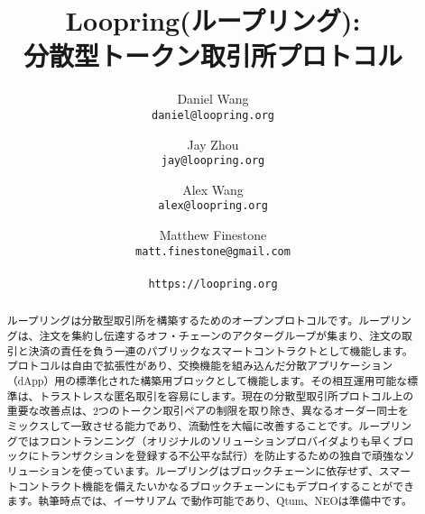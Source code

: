 \documentclass{article}
\title{\textbf{Loopring(ループリング):}\\\textbf{分散型トークン取引所プロトコル}}
\author{
  Daniel Wang\\
  \texttt{daniel@loopring.org}\\
  \and
  	Jay Zhou\\
  	\texttt{jay@loopring.org}\\
  	\and
  	Alex Wang\\
  	\texttt{alex@loopring.org}\\
  	\and
  	Matthew Finestone\\
  	\texttt{matt.finestone@gmail.com}\\ 
  \\
  \texttt{https://loopring.org}
 }
\begin{document}
\maketitle


\begin{abstract}
ループリングは分散型取引所を構築するためのオープンプロトコルです。ループリングは、注文を集約し伝達するオフ・チェーンのアクターグループが集まり、注文の取引と決済の責任を負う一連のパブリックなスマートコントラクトとして機能します。プロトコルは自由で拡張性があり、交換機能を組み込んだ分散アプリケーション（dApp）用の標準化された構築用ブロックとして機能します。その相互運用可能な標準は、トラストレスな匿名取引を容易にします。現在の分散型取引所プロトコル上の重要な改善点は、2つのトークン取引ペアの制限を取り除き、異なるオーダー同士をミックスして一致させる能力であり、流動性を大幅に改善することです。ループリングではフロントランニング（オリジナルのソリューションプロバイダよりも早くブロックにトランザクションを登録する不公平な試行）を防止するための独自で頑強なソリューションを使っています。ループリングはブロックチェーンに依存せず、スマートコントラクト機能を備えたいかなるブロックチェーンにもデプロイすることができます。執筆時点では、イーサリアム\cite{buterin2017ethereum} \cite{wood2014ethereum}で動作可能であり、Qtum\cite{dai2017smart}、NEO\cite{atterlonn2018distributed}は準備中です。
\end{abstract}
\end{document}
